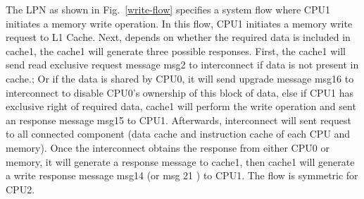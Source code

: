 \documentclass[conference]{IEEEtran}
\begin{document}
The LPN as shown in Fig.~\ref{write-flow} specifies a system flow where CPU1 initiates a memory write operation. In this flow, CPU1 initiates a memory write request to L1 Cache. Next, depends on whether the required data is included in cache1, the cache1 will generate three possible responses. First, the cache1 will send read exclusive request message msg2 to interconnect if data is not present in cache.; Or if the data is shared by CPU0, it will send upgrade message msg16 to interconnect to disable CPU0's ownership of this block of data, else if CPU1 has exclusive right of required data, cache1 will perform the write operation and sent an response message msg15 to CPU1. Afterwards, interconnect will sent request to all connected component (data cache and instruction cache of each CPU and memory). Once the interconnect obtains the response from either CPU0 or memory, it will generate a response message to cache1, then cache1 will generate a write response message msg14 (or msg 21 ) to CPU1. The flow is symmetric for CPU2.
\end{document}
